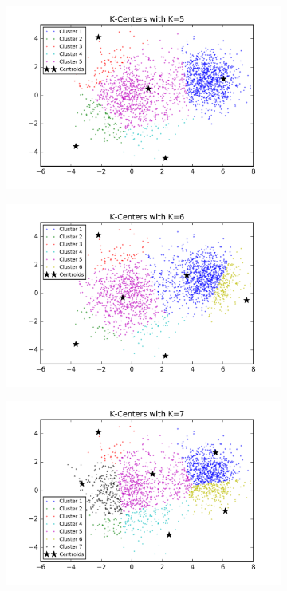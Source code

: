 \begin{figure}[htb]
\begin{subfigure}[b]{0.475\textwidth}
            \includegraphics[width=\textwidth]{./figures/clustering_kCenter_5.png}
        \end{subfigure}
        \hfill
        \begin{subfigure}[b]{0.475\textwidth}   
            \centering 
            \includegraphics[width=\textwidth]{./figures/clustering_kCenter_6.png}
        \end{subfigure}
        \begin{subfigure}[b]{0.475\textwidth}   
            \centering 
            \includegraphics[width=\textwidth]{./figures/clustering_kCenter_7.png}

\end{subfigure}
\end{figure}
